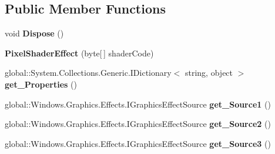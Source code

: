\subsection*{Public Member Functions}
\begin{DoxyCompactItemize}
\item 
\mbox{\label{class_microsoft_1_1_graphics_1_1_canvas_1_1_effects_1_1_pixel_shader_effect_a40ea7bc41c5990f325f933e0a0881f9a}} 
void {\bfseries Dispose} ()
\item 
\mbox{\label{class_microsoft_1_1_graphics_1_1_canvas_1_1_effects_1_1_pixel_shader_effect_ae634b2439aa46fb75d92d21c5e6af991}} 
{\bfseries Pixel\+Shader\+Effect} (byte\mbox{[}$\,$\mbox{]} shader\+Code)
\item 
\mbox{\label{class_microsoft_1_1_graphics_1_1_canvas_1_1_effects_1_1_pixel_shader_effect_aa9cc971756f66f475d464b75ad4408e0}} 
global\+::\+System.\+Collections.\+Generic.\+I\+Dictionary$<$ string, object $>$ {\bfseries get\+\_\+\+Properties} ()
\item 
\mbox{\label{class_microsoft_1_1_graphics_1_1_canvas_1_1_effects_1_1_pixel_shader_effect_ab9532ff2935e7e1a6de0133ab7b0c1a6}} 
global\+::\+Windows.\+Graphics.\+Effects.\+I\+Graphics\+Effect\+Source {\bfseries get\+\_\+\+Source1} ()
\item 
\mbox{\label{class_microsoft_1_1_graphics_1_1_canvas_1_1_effects_1_1_pixel_shader_effect_a2e2e6417703fab0906196222dae0f84c}} 
global\+::\+Windows.\+Graphics.\+Effects.\+I\+Graphics\+Effect\+Source {\bfseries get\+\_\+\+Source2} ()
\item 
\mbox{\label{class_microsoft_1_1_graphics_1_1_canvas_1_1_effects_1_1_pixel_shader_effect_a5acf8d1922a7b1252c1d8dd3f5b0161e}} 
global\+::\+Windows.\+Graphics.\+Effects.\+I\+Graphics\+Effect\+Source {\bfseries get\+\_\+\+Source3} ()
\item 

\end{DoxyCompactItemize}
